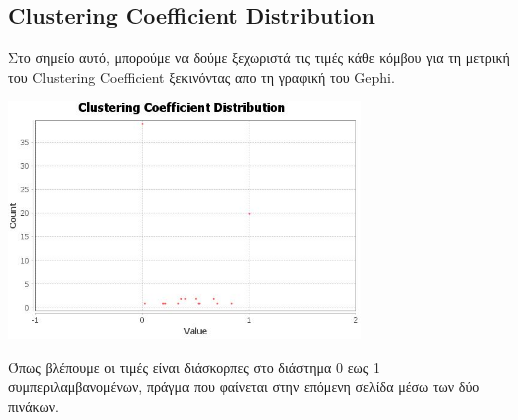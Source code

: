 \documentclass[12pt]{article}
\begin{document}
	
	\newpage
	\subsection{Clustering Coefficient Distribution}
	Στο σημείο αυτό, μπορούμε να δούμε ξεχωριστά τις τιμές κάθε κόμβου για τη μετρική του Clustering Coefficient ξεκινόντας απο τη γραφική του Gephi.
	\begin{center}
		\includegraphics[width=0.7\textwidth]{photos-files/section8/distribution.JPG}
	\end{center}
	\par
	Όπως βλέπουμε οι τιμές είναι διάσκορπες στο διάστημα 0 εως 1 συμπεριλαμβανομένων, πράγμα που φαίνεται στην επόμενη σελίδα μέσω των δύο πινάκων.
\end{document}
